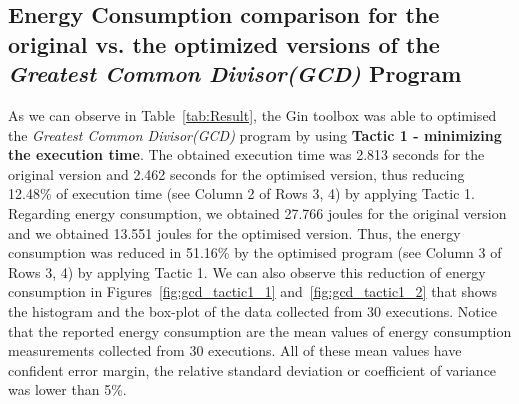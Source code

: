 \vspace{-5pt}
\subsection{Energy Consumption comparison for the original vs. the optimized versions of the \textit{Greatest Common Divisor(GCD)} Program}

As we can observe in Table~\ref{tab:Result}, the Gin toolbox was able to optimised the \textit{Greatest Common Divisor(GCD)} program by using \textbf{Tactic 1 - minimizing the execution time}. The obtained execution time was 2.813 seconds for the original version and 2.462  seconds for the optimised version, thus reducing 12.48\% of execution time (see Column 2 of Rows 3, 4) by applying Tactic 1. 
Regarding energy consumption, we obtained 27.766 joules for the original version and we obtained 13.551 joules for the optimised version. Thus, the energy consumption was reduced in 51.16\% by the optimised program (see Column 3 of Rows 3, 4) by applying Tactic 1.  
We can also observe this reduction of energy consumption in Figures~\ref{fig:gcd_tactic1_1} and~\ref{fig:gcd_tactic1_2} that shows the histogram and the box-plot of the data collected from 30 executions.
Notice that the reported energy consumption are the mean values of energy consumption measurements collected from 30 executions. All of these mean values have confident error margin, \ie the relative standard deviation or coefficient of variance was lower than 5\%.


